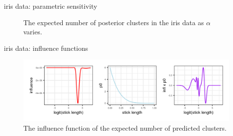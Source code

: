 \begin{frame}{iris data: parametric sensitivity}
  \begin{figure}[!h]
    \centering
    \caption*{The expected number of posterior clusters in the iris data as $\alpha$ varies.}
  \end{figure}

\end{frame}

\begin{frame}{iris data: influence functions}
  \begin{figure}[!h]
    \centering
    \includegraphics[width = \textwidth]{./figures/iris_influence_function.png}
    \caption*{The influence function of the expected number of predicted clusters.}
\end{figure}
\end{frame}

